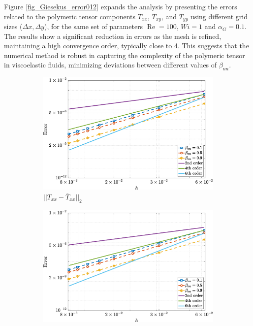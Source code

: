 \documentclass[preprint, 12pt]{elsarticle}
\begin{document}
Figure \ref{fig_Giesekus_error012} expands the analysis by presenting the
errors related to the polymeric tensor components $T_{xx}$, $T_{xy}$, and
$T_{yy}$ using different grid sizes ($\Delta x, \Delta y$), for the same set of
parameters $\operatorname{Re} = 100$, $Wi = 1$ and $\alpha_G = 0.1$. The
results show a significant reduction in errors as the mesh is refined,
maintaining a high convergence order, typically close to 4. This suggests that
the numerical method is robust in capturing the complexity of the polymeric
tensor in viscoelastic fluids, minimizing deviations between different values
of $\beta_{nn}$.

\begin{figure}[H]
    \centering  
    \begin{subfigure}[b]{.46\textwidth}
        \includegraphics[width=\textwidth]{NormErr_2nd_Re_100_Wi_1_epsilon_0_xi_0_alphaG_0.1_Dt_1e-06_at_0.05_tipsim_1_MMS_12_Txx.eps}
        \caption{$||T_{xx} - \overline{T}_{xx}||_{2}$}
        \label{error_txx_2nd_Case1_giesekus_alphaG_0.1}
    \end{subfigure}
    \vspace{0.2cm}
    \qquad
    \begin{subfigure}[b]{.46\textwidth}
        \includegraphics[width=\textwidth]{NormErr_2nd_Re_100_Wi_1_epsilon_0_xi_0_alphaG_0.1_Dt_1e-06_at_0.05_tipsim_1_MMS_12_Txy.eps}

\end{subfigure}
\end{figure}
\end{document}
